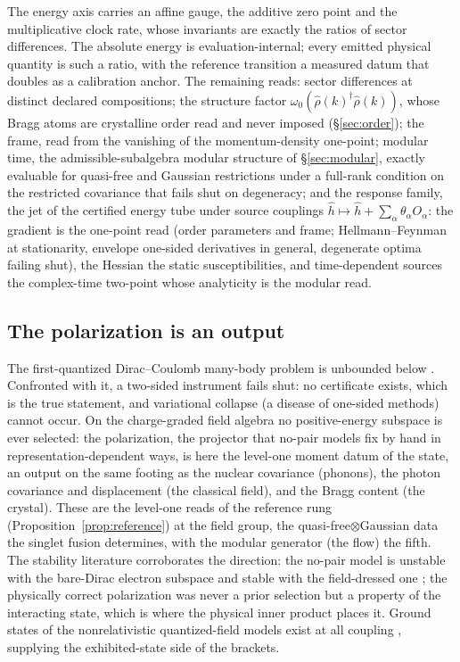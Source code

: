 \documentclass[11pt]{article}
\theoremstyle{definition}
\theoremstyle{remark}
\newcommand{\w}{\omega_0}
\begin{document}
The energy axis carries an affine gauge, the additive zero point and the
multiplicative clock rate, whose invariants are exactly the ratios of
sector differences.  The absolute energy is evaluation-internal; every
emitted physical quantity is such a ratio, with the reference transition
a measured datum that doubles as a calibration anchor.  The remaining
reads: sector differences at distinct declared compositions; the
structure factor $\w(\hat\rho(k)^\dagger\hat\rho(k))$, whose Bragg atoms
are crystalline order read and never imposed (\S\ref{sec:order}); the
frame, read from the vanishing of the momentum-density one-point; modular
time, the admissible-subalgebra modular structure of \S\ref{sec:modular},
exactly evaluable for quasi-free and Gaussian restrictions under a
full-rank condition on the restricted covariance that fails shut on
degeneracy; and the response family, the jet of the certified energy
tube under source couplings $\hat h \mapsto \hat h + \sum_\alpha
\theta_\alpha O_\alpha$: the gradient is the one-point read (order
parameters and frame; Hellmann--Feynman at stationarity, envelope
one-sided derivatives in general, degenerate optima failing shut), the
Hessian the static susceptibilities, and time-dependent sources the
complex-time two-point whose analyticity is the modular read.

\subsection{The polarization is an output}\label{sec:sea-instance}
The first-quantized Dirac--Coulomb many-body problem is unbounded below
\cite{brownravenhall}.  Confronted with it, a two-sided instrument fails
shut: no certificate exists, which is the true statement, and
variational collapse (a disease of one-sided methods) cannot occur.
On the charge-graded field algebra no positive-energy subspace is ever
selected: the polarization, the projector that no-pair models fix by
hand in representation-dependent ways, is here the level-one moment
datum of the state, an output on the same footing as the nuclear
covariance (phonons), the photon covariance and displacement (the
classical field), and the Bragg content (the crystal).  These are the
level-one reads of the reference rung (Proposition~\ref{prop:reference})
at the field group, the quasi-free$\otimes$Gaussian data the singlet
fusion determines, with the modular generator (the flow) the fifth.  The
stability
literature corroborates the direction: the no-pair model is unstable
with the bare-Dirac electron subspace \cite{lss} and stable with the
field-dressed one \cite{liebloss}; the physically correct polarization
was never a prior selection but a property of the interacting state,
which is where the physical inner product places it.  Ground states of
the nonrelativistic quantized-field models exist at all coupling
\cite{gll}, supplying the exhibited-state side of the brackets.
\end{document}
